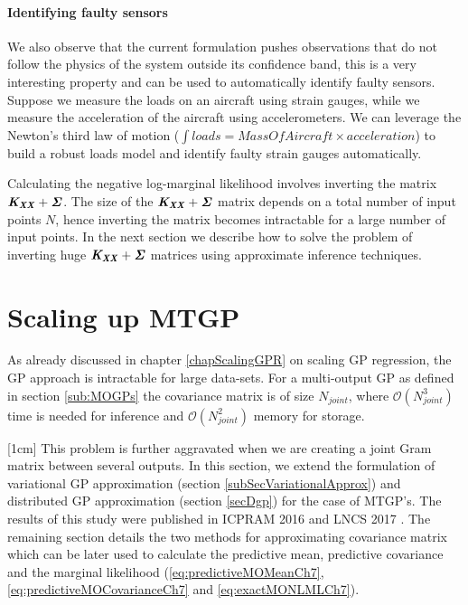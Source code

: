 \paragraph{Identifying faulty sensors}
We also observe that the current formulation pushes observations that do not follow the physics of the system outside its confidence band, this is a very interesting property and can be used to automatically identify faulty sensors. Suppose we measure the loads on an aircraft using strain gauges, while we measure the acceleration of the aircraft using accelerometers. We can leverage the Newton's third law of motion ($\int loads = MassOfAircraft \times acceleration$) to build a robust loads model and identify faulty strain gauges automatically. 

Calculating the negative log-marginal likelihood involves inverting the matrix \(\bm{\mathit{K_{XX}}} + \bm{\mathit{\Sigma}}\). The size of the \(\bm{\mathit{K_{XX}}} + \bm{\mathit{\Sigma}}\) matrix depends on a total number of input points \(N\), hence inverting the matrix becomes intractable for a large number of input points. In the next section we describe how to solve the problem of inverting huge \(\bm{\mathit{K_{XX}}} + \bm{\mathit{\Sigma}}\) matrices using approximate inference techniques.

\section{Scaling up MTGP}\label{sec:sparseGPRegression}
As already discussed in chapter \ref{chapScalingGPR} on scaling GP regression, the GP approach is intractable for large data-sets. For a multi-output GP as defined in section \ref{sub:MOGPs} the covariance matrix is of size \(N_{joint}\),  where \(\mathcal{O}\left ( N_{joint}^{3} \right )\) time is needed for inference and \(\mathcal{O}\left ( N_{joint}^{2} \right )\) memory for storage. 

[1cm]
This problem is further aggravated when we are creating a joint Gram matrix between several outputs. In this section, we extend the formulation of variational GP approximation (section \ref{subSecVariationalApprox}) and distributed GP approximation (section \ref{secDgp}) for the case of MTGP's. The results of this study were published in ICPRAM 2016 and LNCS 2017 \cite{icpram16Ankit, oatao18000}. The remaining section details the two methods for approximating covariance matrix which can be later used to calculate the predictive mean, predictive covariance and the marginal likelihood (\ref{eq:predictiveMOMeanCh7}, \ref{eq:predictiveMOCovarianceCh7} and \ref{eq:exactMONLMLCh7}).

